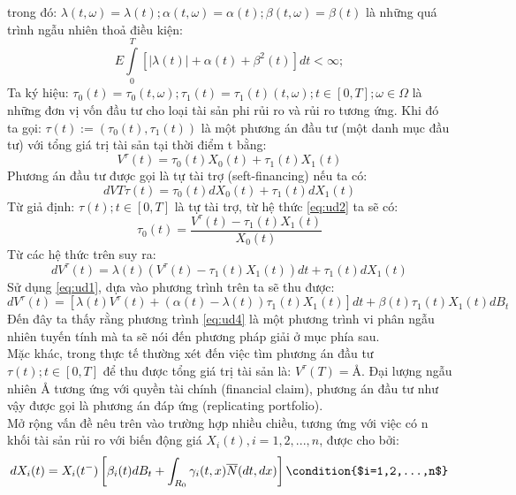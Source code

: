 \documentclass[12pt,a4paper]{article}
\begin{document}
trong đó: $\lambda(t,\omega)=\lambda(t);\alpha(t,\omega)=\alpha(t);\beta(t,\omega)=\beta(t)$ là những quá trình ngẫu nhiên thoả điều kiện:
\begin{equation*}
	E\int\limits_{0}^{T}[|\lambda(t)|+\alpha(t)+\beta^2(t)]dt<\infty;
\end{equation*}
Ta ký hiệu: $\tau_0(t)=\tau_0(t,\omega);\tau_1(t)=\tau_1(t)(t,\omega);t\in[0,T];\omega\in \Omega$ là những đơn vị vốn đầu tư cho loại tài sản phi rủi ro và rủi ro tương ứng. Khi đó ta gọi: $\tau(t):=(\tau_0(t),\tau_1(t))$ là một phương án đầu tư (một danh mục đầu tư) với tổng giá trị tài sản tại thời điểm t bằng:
\begin{equation}\label{eq:ud2}
	V^\tau(t)=\tau_0(t)X_0(t)+\tau_1(t)X_1(t)	
\end{equation}
Phương án đầu tư được gọi là tự tài trợ (seft-financing) nếu ta có:
\begin{equation}\label{eq:ud3}
	dVT\tau(t)=\tau_0(t)dX_0(t)+\tau_1(t)dX_1(t)
\end{equation}
Từ giả định: $\tau(t);t\in[0,T]$ là tự tài trợ, từ hệ thức \eqref{eq:ud2} ta sẽ có:
\begin{equation*}
	\tau_0(t)=\dfrac{V^\tau(t)-\tau_1(t)X_1(t)}{X_0(t)}
\end{equation*}
Từ các hệ thức trên suy ra:
\begin{equation*}
	dV^\tau(t)=\lambda(t)(V^\tau(t)-\tau_1(t)X_1(t))dt+\tau_1(t)dX_1(t)
\end{equation*}
Sử dụng \eqref{eq:ud1}, dựa vào phương trình trên ta sẽ thu được:
\begin{equation}\label{eq:ud4}
	dV^\tau(t)=[\lambda(t)V^\tau(t)+(\alpha(t)-\lambda(t))\tau_1(t)X_1(t)]dt +\beta(t)\tau_1(t)X_1(t)dB_t
\end{equation}
Đến đây ta thấy rằng phương trình \eqref{eq:ud4} là một phương trình vi phân ngẫu nhiên tuyến tính mà ta sẽ nói đến phương pháp giải ở mục phía sau.\\
Mặc khác, trong thực tế thường xét đến việc tìm phương án đầu tư $\tau(t);t\in[0,T]$ để thu được tổng giá trị tài sản là: $V^\tau(T)=\text{\AA}$. Đại lượng ngẫu nhiên $\text{\AA}$ tương ứng với quyền tài chính (financial claim), phương án đầu tư như vậy được gọi là phương án đáp ứng (replicating portfolio).\\
Mở rộng vấn đề nêu trên vào trường hợp nhiều chiều, tương ứng với việc có n khối tài sản rủi ro với biến động giá $X_i(t),i=1,2,...,n$, được cho bởi:
\begin{equation}\label{eq:ud5}
	dX_i(t)=X_i(t^-)\left[\beta_i(t)dB_t+\int_{R_0}\gamma_i(t,x)\overline{N}(dt,dx) \right] \condition{$i=1,2,...,n$}
\end{equation}
\end{document}
